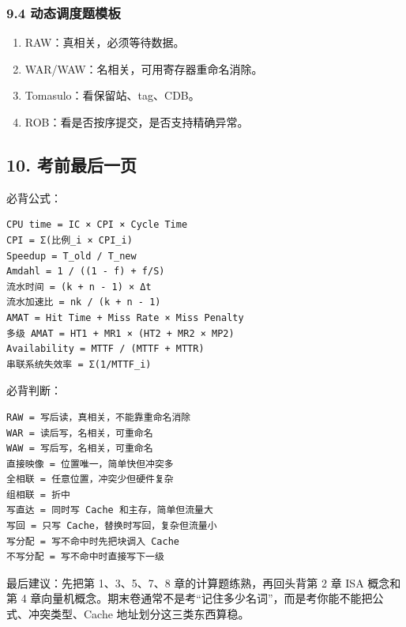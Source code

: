 \documentclass[
]{ctexart}
\providecommand{\tightlist}{%
  \setlength{\itemsep}{0pt}\setlength{\parskip}{0pt}}
\begin{document}
\subsubsection{9.4
动态调度题模板}\label{ux52a8ux6001ux8c03ux5ea6ux9898ux6a21ux677f}

\begin{enumerate}
\def\labelenumi{\arabic{enumi}.}
\tightlist
\item
  RAW：真相关，必须等待数据。
\item
  WAR/WAW：名相关，可用寄存器重命名消除。
\item
  Tomasulo：看保留站、tag、CDB。
\item
  ROB：看是否按序提交，是否支持精确异常。
\end{enumerate}

\subsection{10.
考前最后一页}\label{ux8003ux524dux6700ux540eux4e00ux9875}

必背公式：

\begin{lstlisting}
CPU time = IC × CPI × Cycle Time
CPI = Σ(比例_i × CPI_i)
Speedup = T_old / T_new
Amdahl = 1 / ((1 - f) + f/S)
流水时间 = (k + n - 1) × Δt
流水加速比 = nk / (k + n - 1)
AMAT = Hit Time + Miss Rate × Miss Penalty
多级 AMAT = HT1 + MR1 × (HT2 + MR2 × MP2)
Availability = MTTF / (MTTF + MTTR)
串联系统失效率 = Σ(1/MTTF_i)
\end{lstlisting}

必背判断：

\begin{lstlisting}
RAW = 写后读，真相关，不能靠重命名消除
WAR = 读后写，名相关，可重命名
WAW = 写后写，名相关，可重命名
直接映像 = 位置唯一，简单快但冲突多
全相联 = 任意位置，冲突少但硬件复杂
组相联 = 折中
写直达 = 同时写 Cache 和主存，简单但流量大
写回 = 只写 Cache，替换时写回，复杂但流量小
写分配 = 写不命中时先把块调入 Cache
不写分配 = 写不命中时直接写下一级
\end{lstlisting}

最后建议：先把第 1、3、5、7、8 章的计算题练熟，再回头背第 2 章 ISA
概念和第 4
章向量机概念。期末卷通常不是考``记住多少名词''，而是考你能不能把公式、冲突类型、Cache
地址划分这三类东西算稳。
\end{document}
